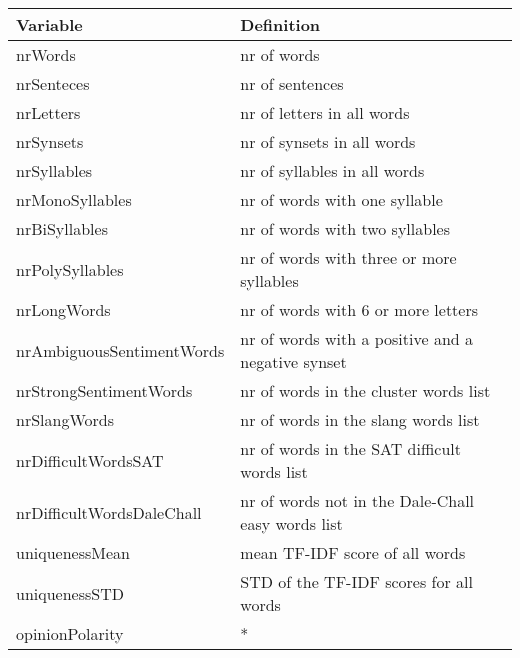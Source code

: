 \begin{tabular}{|l|l|} \hline
\textbf{Variable} & \textbf{Definition} \\ \hline
nrWords & nr of words \\ \hline
nrSenteces & nr of sentences \\ \hline
nrLetters & nr of letters in all words \\ \hline
nrSynsets & nr of synsets in all words \\ \hline
nrSyllables & nr of syllables in all words \\ \hline
nrMonoSyllables & nr of words with one syllable \\ \hline
nrBiSyllables & nr of words with two syllables \\ \hline
nrPolySyllables & nr of words with three or more syllables \\ \hline
nrLongWords & nr of words with 6 or more letters \\ \hline
nrAmbiguousSentimentWords & nr of words with a positive and a negative synset \\ \hline
nrStrongSentimentWords & nr of words in the cluster words list \\ \hline
nrSlangWords & nr of words in the slang words list \\ \hline
nrDifficultWordsSAT & nr of words in the SAT difficult words list \\ \hline
nrDifficultWordsDaleChall & nr of words not in the Dale-Chall easy words list \\ \Xhline{3\arrayrulewidth}
uniquenessMean & mean TF-IDF score of all words \\ \hline
uniquenessSTD & STD of the TF-IDF scores for all words \\ \hline
opinionPolarity & * \\ \hline
\end{tabular}